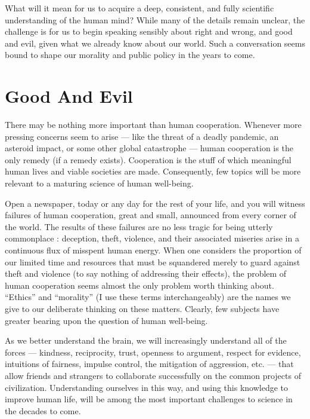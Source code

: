 \documentclass[a4paper,14pt]{extarticle}
\begin{document}
What will it mean for us to acquire a deep, consistent, and fully scientific understanding of the human mind?
While many of the details remain unclear, the challenge is for us to begin speaking sensibly about right and wrong, and good and evil, given what we already know about our world.
Such a conversation seems bound to shape our morality and public policy in the years to come.

\newpage
\section{Good And Evil}

There may be nothing more important than human cooperation.
Whenever more pressing concerns seem to arise --- like the threat of a deadly pandemic, an asteroid impact, or some other global catastrophe --- human cooperation is the only remedy (if a remedy exists).
Cooperation is the stuff of which meaningful human lives and viable societies are made.
Consequently, few topics will be more relevant to a maturing science of human well-being.

Open a newspaper, today or any day for the rest of your life, and you will witness failures of human cooperation, great and small, announced from every corner of the world.
The results of these failures are no less tragic for being utterly commonplace :
deception, theft, violence, and their associated miseries arise in a continuous flux of misspent human energy.
When one considers the proportion of our limited time and resources that must be squandered merely to guard against theft and violence (to say nothing of addressing their effects), the problem of human cooperation seems almost the only problem worth thinking about.
``Ethics'' and ``morality'' (I use these terms interchangeably) are the names we give to our deliberate thinking on these matters.
Clearly, few subjects have greater bearing upon the question of human well-being.

As we better understand the brain, we will increasingly understand all of the forces --- kindness, reciprocity, trust, openness to argument, respect for evidence, intuitions of fairness, impulse control, the mitigation of aggression, etc. --- that allow friends and strangers to collaborate successfully on the common projects of civilization.
Understanding ourselves in this way, and using this knowledge to improve human life, will be among the most important challenges to science in the decades to come.
\end{document}

